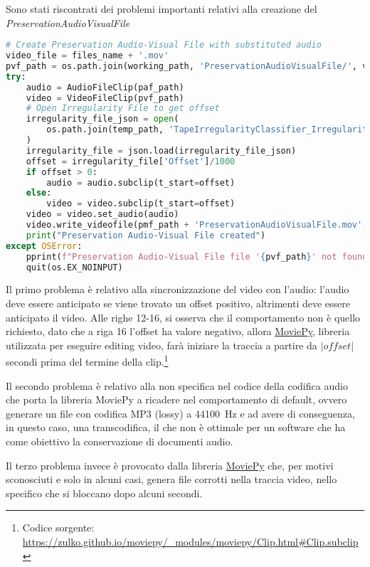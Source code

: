 Sono stati riscontrati dei problemi importanti relativi alla creazione del \textit{PreservationAudioVisualFile}

\begin{lstlisting}[language=Python, caption=Codice iniziale; creazione PreservationAudioVisualFile]
# Create Preservation Audio-Visual File with substituted audio
video_file = files_name + '.mov'
pvf_path = os.path.join(working_path, 'PreservationAudioVisualFile/', video_file)
try:
    audio = AudioFileClip(paf_path)
    video = VideoFileClip(pvf_path)
    # Open Irregularity File to get offset
    irregularity_file_json = open(
        os.path.join(temp_path, 'TapeIrregularityClassifier_IrregularityFileOutput2.json')
    )
    irregularity_file = json.load(irregularity_file_json)
    offset = irregularity_file['Offset']/1000
    if offset > 0:
        audio = audio.subclip(t_start=offset)
    else:
        video = video.subclip(t_start=offset)
    video = video.set_audio(audio)
    video.write_videofile(pmf_path + 'PreservationAudioVisualFile.mov', bitrate='3000k', codec='mpeg4')
    print("Preservation Audio-Visual File created")
except OSError:
    pprint(f"Preservation Audio-Visual File file '{pvf_path}' not found!", color=Color.RED)
    quit(os.EX_NOINPUT)
\end{lstlisting}

Il primo problema è relativo alla sincronizzazione del video con l'audio: l'audio deve essere anticipato se viene trovato un offset positivo, altrimenti deve essere anticipato il video.
Alle righe 12-16, si osserva che il comportamento non è quello richiesto, dato che a riga 16 l'offset ha valore negativo, allora \href{https://zulko.github.io/moviepy/}{MoviePy}, libreria utilizzata per eseguire editing video, farà iniziare la traccia a partire da $|offset|$ secondi prima del termine della clip.\footnote{Codice sorgente: \url{https://zulko.github.io/moviepy/_modules/moviepy/Clip.html#Clip.subclip}}    %

Il secondo problema è relativo alla non specifica nel codice della codifica audio che porta la libreria MoviePy a ricadere nel comportamento di default, ovvero generare un file con codifica MP3 (lossy) a \qty{44100}{\Hz} e ad avere di conseguenza, in questo caso, una transcodifica, il che non è ottimale per un software che ha come obiettivo la conservazione di documenti audio.

Il terzo problema invece è provocato dalla libreria \href{https://zulko.github.io/moviepy/}{MoviePy} che, per motivi sconosciuti e solo in alcuni casi, genera file corrotti nella traccia video, nello specifico che si bloccano dopo alcuni secondi.  %

